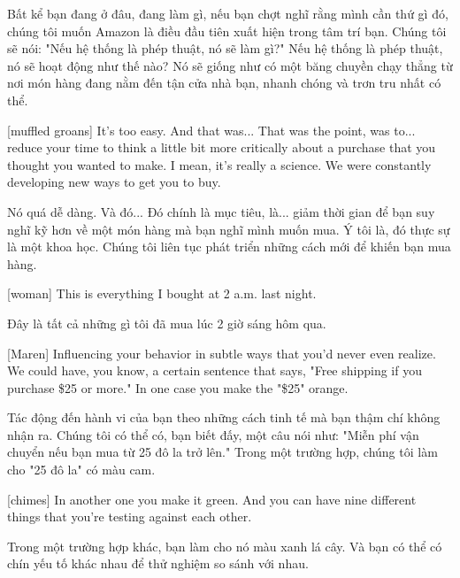 \documentclass[a4paper]{article}
\begin{document}
	
	\begin{vietnamese-v2}
		Bất kể bạn đang ở đâu, đang làm gì, nếu bạn chợt nghĩ rằng mình cần thứ gì đó, chúng tôi muốn Amazon là điều đầu tiên xuất hiện trong tâm trí bạn. Chúng tôi sẽ nói: "Nếu hệ thống là phép thuật, nó sẽ làm gì?" 
		Nếu hệ thống là phép thuật, nó sẽ hoạt động như thế nào? Nó sẽ giống như có một băng chuyền chạy thẳng từ nơi món hàng đang nằm đến tận cửa nhà bạn, nhanh chóng và trơn tru nhất có thể.
	\end{vietnamese-v2}
	
	[muffled groans]
	It's too easy. And that was... That was the point, was to... reduce your time to think a little bit more critically about a purchase that you thought you wanted to make.
	I mean, it's really a science.
	We were constantly developing new ways to get you to buy.
	
	
	\begin{vietnamese-v2}
		Nó quá dễ dàng. Và đó... Đó chính là mục tiêu, là... giảm thời gian để bạn suy nghĩ kỹ hơn về một món hàng mà bạn nghĩ mình muốn mua. 
		Ý tôi là, đó thực sự là một khoa học. 
		Chúng tôi liên tục phát triển những cách mới để khiến bạn mua hàng.
	\end{vietnamese-v2}
	
	[woman] This is everything I bought at 2 a.m. last night.
	
	\begin{vietnamese-v2}
		 Đây là tất cả những gì tôi đã mua lúc 2 giờ sáng hôm qua.
	\end{vietnamese-v2}
	
	[Maren] Influencing your behavior in subtle ways that you'd never even realize. We could have, you know, a certain sentence that says, "Free shipping if you purchase \$25 or more." In one case you make the "\$25" orange.

	\begin{vietnamese-v2}
		[Maren] Tác động đến hành vi của bạn theo những cách tinh tế mà bạn thậm chí không nhận ra. Chúng tôi có thể có, bạn biết đấy, một câu nói như: "Miễn phí vận chuyển nếu bạn mua từ 25 đô la trở lên." Trong một trường hợp, chúng tôi làm cho "25 đô la" có màu cam.
	\end{vietnamese-v2}

	[chimes]
	In another one you make it green. And you can have nine different things that you're testing against each other.
	
	\begin{vietnamese-v2}
		Trong một trường hợp khác, bạn làm cho nó màu xanh lá cây. Và bạn có thể có chín yếu tố khác nhau để thử nghiệm so sánh với nhau.
	\end{vietnamese-v2}
	
\end{document}
